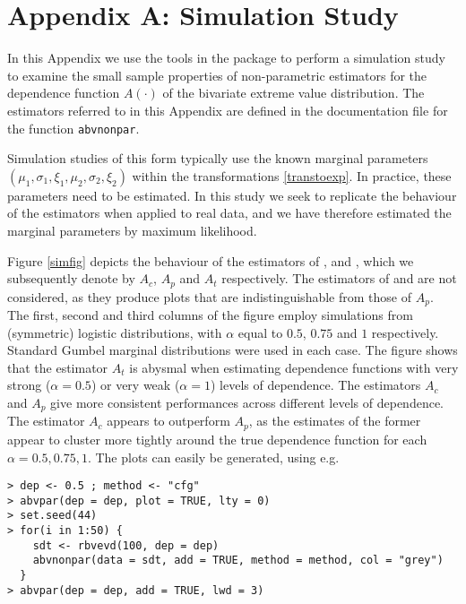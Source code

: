 \documentclass[11pt,a4paper]{article}
\begin{document}
\section*{Appendix A: Simulation Study}

In this Appendix we use the tools in the package to perform a simulation study to examine the small sample properties of non-parametric estimators for the dependence function $A(\cdot)$ of the bivariate extreme value distribution.
The estimators referred to in this Appendix are defined in the documentation file for the function \verb+abvnonpar+.

Simulation studies of this form \citep[e.g.][]{halltajv00} typically use the known marginal parameters $(\mu_1,\sigma_1,\xi_1,\mu_2,\sigma_2,\xi_2)$ within the transformations \eqref{transtoexp}.
In practice, these parameters need to be estimated.
In this study we seek to replicate the behaviour of the estimators when applied to real data, and we have therefore estimated the marginal parameters by maximum likelihood.

Figure \ref{simfig} depicts the behaviour of the estimators of \citet{capefoug97}, \citet{pick81} and \citet{tiag97}, which we subsequently denote by $A_c$, $A_p$ and $A_t$ respectively. The estimators of \citet{dehe91} and \citet{halltajv00} are not considered, as they produce plots that are indistinguishable from those of $A_p$. 
The first, second and third columns of the figure employ simulations from (symmetric) logistic distributions, with $\alpha$ equal to $0.5$, $0.75$ and $1$ respectively. 
Standard Gumbel marginal distributions were used in each case.
The figure shows that the estimator $A_t$ is abysmal when estimating dependence functions with very strong ($\alpha = 0.5$) or very weak ($\alpha = 1$) levels of dependence.
The estimators $A_c$ and $A_p$ give more consistent performances across different levels of dependence.
The estimator $A_c$ appears to outperform $A_p$, as the estimates of the former appear to cluster more tightly around the true dependence function for each $\alpha = 0.5,0.75,1$.
The plots can easily be generated, using e.g.

\begin{verbatim}
> dep <- 0.5 ; method <- "cfg"
> abvpar(dep = dep, plot = TRUE, lty = 0)
> set.seed(44)
> for(i in 1:50) {
    sdt <- rbvevd(100, dep = dep)
    abvnonpar(data = sdt, add = TRUE, method = method, col = "grey")
  }
> abvpar(dep = dep, add = TRUE, lwd = 3)
\end{verbatim}
\end{document}
